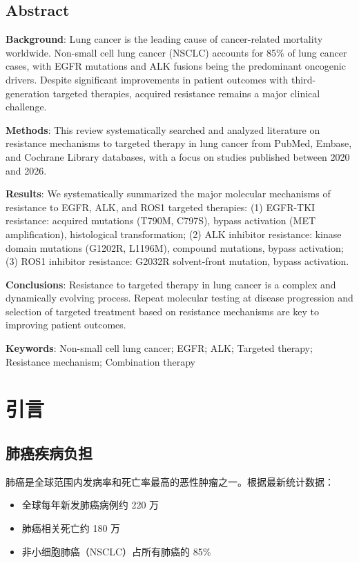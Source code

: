 \documentclass[12pt,a4paper]{article}
\newenvironment{englishabstract}
    {\begin{center}\begin{minipage}{0.9\textwidth}
     \section*{Abstract}
     \addcontentsline{toc}{section}{Abstract}}
    {\end{minipage}\end{center}}
\begin{document}
\begin{englishabstract}
\noindent
\textbf{Background}: Lung cancer is the leading cause of cancer-related mortality worldwide. Non-small cell lung cancer (NSCLC) accounts for 85\% of lung cancer cases, with EGFR mutations and ALK fusions being the predominant oncogenic drivers. Despite significant improvements in patient outcomes with third-generation targeted therapies, acquired resistance remains a major clinical challenge.

\textbf{Methods}: This review systematically searched and analyzed literature on resistance mechanisms to targeted therapy in lung cancer from PubMed, Embase, and Cochrane Library databases, with a focus on studies published between 2020 and 2026.

\textbf{Results}: We systematically summarized the major molecular mechanisms of resistance to EGFR, ALK, and ROS1 targeted therapies: (1) EGFR-TKI resistance: acquired mutations (T790M, C797S), bypass activation (MET amplification), histological transformation; (2) ALK inhibitor resistance: kinase domain mutations (G1202R, L1196M), compound mutations, bypass activation; (3) ROS1 inhibitor resistance: G2032R solvent-front mutation, bypass activation.

\textbf{Conclusions}: Resistance to targeted therapy in lung cancer is a complex and dynamically evolving process. Repeat molecular testing at disease progression and selection of targeted treatment based on resistance mechanisms are key to improving patient outcomes.

\vspace{1em}
\noindent\textbf{Keywords}: Non-small cell lung cancer; EGFR; ALK; Targeted therapy; Resistance mechanism; Combination therapy
\end{englishabstract}

\newpage
\tableofcontents
\newpage

\section{引言}

\subsection{肺癌疾病负担}

肺癌是全球范围内发病率和死亡率最高的恶性肿瘤之一。根据最新统计数据：
\begin{itemize}
    \item 全球每年新发肺癌病例约 220 万
    \item 肺癌相关死亡约 180 万
    \item 非小细胞肺癌（NSCLC）占所有肺癌的 85\%
\end{itemize}
\end{document}
